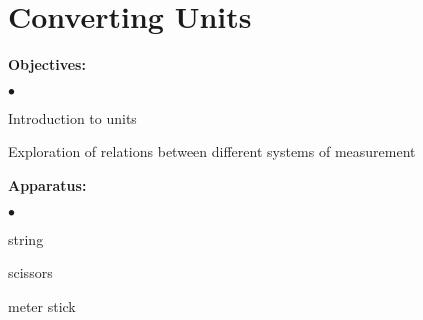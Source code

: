 
\section{Converting Units}

\makelabheader %

\bigskip

\textbf{Objectives:}
\begin{list}{$\bullet$}{\itemsep0pt }
\item Introduction to units \item Exploration of relations between different systems of measurement

\end{list}

\textbf{Apparatus:}
\begin{list}{$\bullet$}{\itemsep0pt }
\item string \item scissors \item meter stick
\end{list}

